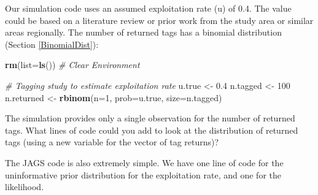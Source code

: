 \documentclass[
]{krantz}
\makeatletter
\newenvironment{Shaded}{\begin{snugshade}}{\end{snugshade}}
\newcommand{\AttributeTok}[1]{\textcolor[rgb]{0.27,0.27,0.27}{#1}}
\newcommand{\CommentTok}[1]{\textcolor[rgb]{0.37,0.37,0.37}{\textit{#1}}}
\newcommand{\DecValTok}[1]{\textcolor[rgb]{0.06,0.06,0.06}{#1}}
\newcommand{\FloatTok}[1]{\textcolor[rgb]{0.06,0.06,0.06}{#1}}
\newcommand{\FunctionTok}[1]{\textcolor[rgb]{0.27,0.27,0.27}{\textbf{#1}}}
\newcommand{\NormalTok}[1]{#1}
\newcommand{\OtherTok}[1]{\textcolor[rgb]{0.37,0.37,0.37}{#1}}
\newenvironment{kframe}{%
\medskip{}
\setlength{\fboxsep}{.8em}
 \def\at@end@of@kframe{}%
 \ifinner\ifhmode%
  \def\at@end@of@kframe{\end{minipage}}%
  \begin{minipage}{\columnwidth}%
 \fi\fi%
 \def\FrameCommand##1{\hskip\@totalleftmargin \hskip-\fboxsep
 \colorbox{shadecolor}{##1}\hskip-\fboxsep
     \hskip-\linewidth \hskip-\@totalleftmargin \hskip\columnwidth}%
 \MakeFramed {\advance\hsize-\width
   \@totalleftmargin\z@ \linewidth\hsize
   \@setminipage}}%
 {\par\unskip\endMakeFramed%
 \at@end@of@kframe}
\renewenvironment{Shaded}{\begin{kframe}}{\end{kframe}}
\makeatother
\begin{document}
Our simulation code uses an assumed exploitation rate (u) of 0.4. The value could be based on a literature review or prior work from the study area or similar areas regionally. The number of returned tags has a binomial distribution (Section \ref{BinomialDist}):

\begin{Shaded}
\begin{Highlighting}[]
\FunctionTok{rm}\NormalTok{(}\AttributeTok{list=}\FunctionTok{ls}\NormalTok{()) }\CommentTok{\# Clear Environment}

\CommentTok{\# Tagging study to estimate exploitation rate}
\NormalTok{u.true }\OtherTok{\textless{}{-}} \FloatTok{0.4}
\NormalTok{n.tagged }\OtherTok{\textless{}{-}} \DecValTok{100}
\NormalTok{n.returned }\OtherTok{\textless{}{-}} \FunctionTok{rbinom}\NormalTok{(}\AttributeTok{n=}\DecValTok{1}\NormalTok{, }\AttributeTok{prob=}\NormalTok{u.true, }\AttributeTok{size=}\NormalTok{n.tagged)}
\end{Highlighting}
\end{Shaded}

The simulation provides only a single observation for the number of returned tags. What lines of code could you add to look at the distribution of returned tags (using a new variable for the vector of tag returns)?

The JAGS code is also extremely simple. We have one line of code for the uninformative prior distribution for the exploitation rate, and one for the likelihood.
\end{document}
